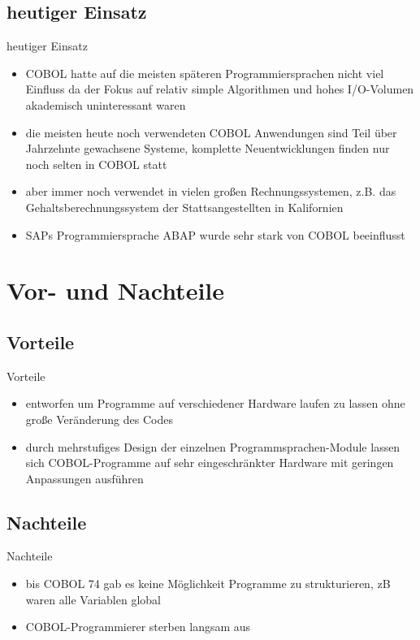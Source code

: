 \documentclass{beamer}
\begin{document}
\subsection{heutiger Einsatz}

\begin{frame}{heutiger Einsatz}
	\begin{itemize}
		\item
			COBOL hatte auf die meisten sp\"ateren Programmiersprachen nicht viel Einfluss da der Fokus auf relativ simple Algorithmen und hohes I/O-Volumen akademisch uninteressant waren
		\item
			die meisten heute noch verwendeten COBOL Anwendungen sind Teil \"uber Jahrzehnte gewachsene Systeme, komplette Neuentwicklungen finden nur noch selten in COBOL statt
		\item
			aber immer noch verwendet in vielen großen Rechnungssystemen, z.B. das Gehaltsberechnungssystem der Stattsangestellten in Kalifornien
		\item
			SAPs Programmiersprache ABAP wurde sehr stark von COBOL beeinflusst
	\end{itemize}
\end{frame}

\section{Vor- und Nachteile}

\subsection{Vorteile}

\begin{frame}{Vorteile}
	\begin{itemize}
		\item
			entworfen um Programme auf verschiedener Hardware laufen zu lassen ohne große Ver\"anderung des Codes
		\item
		    durch mehrstufiges Design der einzelnen Programmsprachen-Module lassen sich COBOL-Programme auf sehr eingeschr\"ankter Hardware mit geringen Anpassungen ausf\"uhren
	\end{itemize}
\end{frame}

\subsection{Nachteile}

\begin{frame}{Nachteile}
	\begin{itemize}
		\item
		    bis COBOL 74 gab es keine M\"oglichkeit Programme zu strukturieren, zB waren alle Variablen global
		\item
			COBOL-Programmierer sterben langsam aus
	\end{itemize}
\end{frame}
\end{document}
